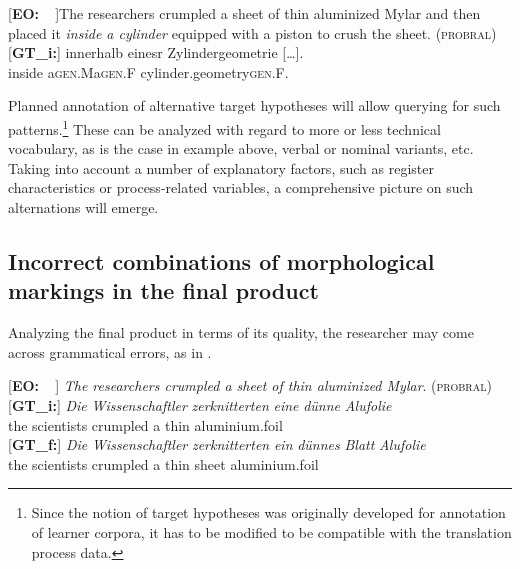 \documentclass[output=paper]{LSP/langsci}
\begin{document}
\ea \label{ex:1:6}
\begin{xlist}
\exi{}[\textbf{EO:~~}]{The researchers crumpled a sheet of thin aluminized Mylar and then placed it \emph{inside a cylinder} equipped with a piston to crush the sheet. (\textsc{probral})}
\exi{}[\textbf{GT\_i:}]{
\gll [...] innerhalb\raute{} eines\stern\raute\stern\stern\stern\stern\pfeil\pfeil{}r\raute{}  Z\stern{}ylindergeometrie [\dots].\\
{} inside a{\tiny \textsc{gen}.M}\stern\raute\stern\stern\stern\stern{}a{\tiny \textsc{gen}.F} cylinder.geometry{\tiny \textsc{gen}.F}.\\}
\end{xlist}
\z

Planned annotation of alternative target hypotheses will allow querying for such patterns.\footnote{Since the notion of target hypotheses was originally developed for annotation of learner corpora, it has to be modified to be compatible with the translation process data.} These can be analyzed with regard to more or less technical vocabulary, as is the case in example  above, verbal or nominal variants, etc. Taking into account a number of explanatory factors, such as register characteristics or process-related variables, a comprehensive picture on such alternations will emerge. 

\subsection{Incorrect combinations of morphological markings in the final product} \label{sec:1:3:3}
Analyzing the final product in terms of its quality, the researcher may come across grammatical errors, as in . 

\ea \label{ex:1:7}
\begin{xlist}
\exi{}[\textbf{EO:~~}]{ \emph{The researchers crumpled a sheet of thin aluminized Mylar}. (\textsc{probral})}
\exi{}[\textbf{GT\_i:}]{
\gll \emph{Die} \emph{Wissenschaftler} \emph{zerknitterten} \emph{eine} \emph{dünne} \emph{Alufolie}\\
 the scientists crumpled a thin aluminium.foil\\
}
\exi{}[\textbf{GT\_f:}]{
\gll \emph{Die} \emph{Wissenschaftler} \emph{zerknitterten} \emph{ein} \emph{dünnes} \emph{Blatt} \emph{Alufolie}\\
the scientists crumpled a thin sheet aluminium.foil\\
}
\end{xlist}
\z
\end{document}
